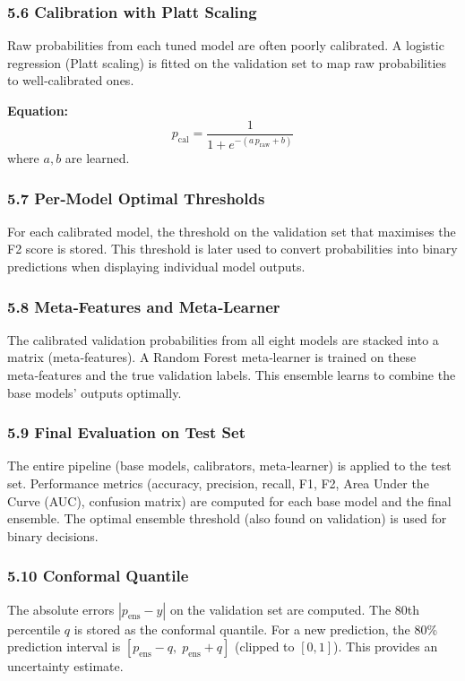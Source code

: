 \documentclass[12pt]{article}
\begin{document}
	\subsubsection{5.6 Calibration with Platt Scaling}
	Raw probabilities from each tuned model are often poorly calibrated. A logistic regression (Platt scaling) is fitted on the validation set to map raw probabilities to well‑calibrated ones.
	
	\textbf{Equation:}
	\[
	p_{\text{cal}} = \frac{1}{1+e^{-(a\,p_{\text{raw}}+b)}}
	\]
	where $a,b$ are learned.
	
	\subsubsection{5.7 Per‑Model Optimal Thresholds}
	For each calibrated model, the threshold on the validation set that maximises the F2 score is stored. This threshold is later used to convert probabilities into binary predictions when displaying individual model outputs.
	
	\subsubsection{5.8 Meta‑Features and Meta‑Learner}
	The calibrated validation probabilities from all eight models are stacked into a matrix (meta‑features). A Random Forest meta‑learner is trained on these meta‑features and the true validation labels. This ensemble learns to combine the base models' outputs optimally.
	
	\subsubsection{5.9 Final Evaluation on Test Set}
	The entire pipeline (base models, calibrators, meta‑learner) is applied to the test set. Performance metrics (accuracy, precision, recall, F1, F2, Area Under the Curve (AUC), confusion matrix) are computed for each base model and the final ensemble. The optimal ensemble threshold (also found on validation) is used for binary decisions.
	
	\subsubsection{5.10 Conformal Quantile}
	The absolute errors $|p_{\text{ens}} - y|$ on the validation set are computed. The 80th percentile $q$ is stored as the conformal quantile. For a new prediction, the 80\% prediction interval is $[p_{\text{ens}}-q,\;p_{\text{ens}}+q]$ (clipped to $[0,1]$). This provides an uncertainty estimate.
	
\end{document}
